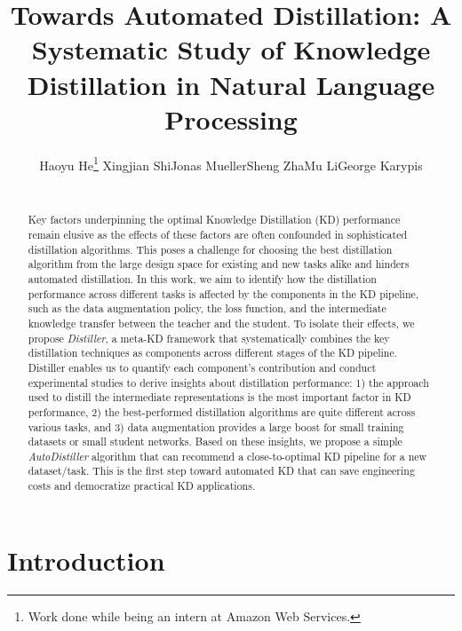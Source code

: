 \documentclass[11pt]{article}
\title{Towards Automated Distillation: A Systematic Study of Knowledge Distillation in Natural Language Processing}
\author{
Haoyu He\affmark[1] \footnote[2]{Work done while being an intern at Amazon Web Services.}  Xingjian Shi\affmark[2]  Jonas Mueller\affmark[2]  Sheng Zha\affmark[2]  Mu Li\affmark[2]  George Karypis\affmark[2]\\
\affaddr{\affmark[1]Northeastern University} \affaddr{\affmark[2]Amazon Web Services}\\
}
\begin{document}
\maketitle

\begin{abstract}
Key factors underpinning the optimal Knowledge Distillation (KD) performance remain elusive as the effects of these factors are often confounded in sophisticated distillation algorithms. This poses a challenge for choosing the best distillation algorithm from the large design space for existing and new tasks alike and hinders automated distillation. In this work, we aim to identify how the distillation performance across different tasks is affected by the components in the KD pipeline, such as the data augmentation policy, the loss function, and the intermediate knowledge transfer between the teacher and the student. To isolate their effects, we propose \emph{Distiller}, a meta-KD framework that systematically combines the key distillation techniques as components across different stages of the KD pipeline. Distiller enables us to quantify each component's contribution and conduct 
experimental studies to derive insights about distillation performance:
1) the approach used to distill the intermediate representations is the most important factor in KD performance,
2) the best-performed distillation algorithms are quite different across various tasks, and
3) data augmentation provides a large boost for small training datasets or small student networks.
Based on these insights, we propose a simple \emph{AutoDistiller} algorithm that can recommend a close-to-optimal KD pipeline for a new dataset/task. This is the first step toward automated KD that can save engineering costs and democratize practical KD applications.
\end{abstract}
\section{Introduction}
\end{document}
